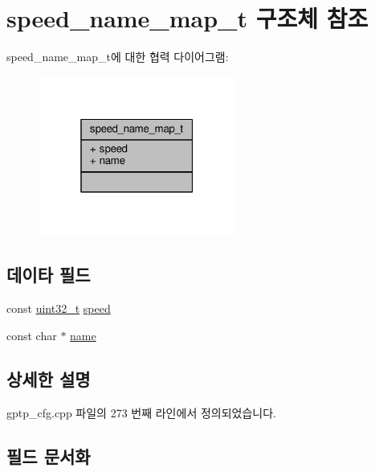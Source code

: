 \hypertarget{structspeed__name__map__t}{}\section{speed\+\_\+name\+\_\+map\+\_\+t 구조체 참조}
\label{structspeed__name__map__t}


speed\+\_\+name\+\_\+map\+\_\+t에 대한 협력 다이어그램\+:
\nopagebreak
\begin{figure}[H]
\begin{center}
\leavevmode
\includegraphics[width=184pt]{structspeed__name__map__t__coll__graph}
\end{center}
\end{figure}
\subsection*{데이타 필드}
\begin{DoxyCompactItemize}
\item 
const \hyperlink{parse_8c_a6eb1e68cc391dd753bc8ce896dbb8315}{uint32\+\_\+t} \hyperlink{structspeed__name__map__t_a4bec965cf156a882c43280397a9d3f19}{speed}
\item 
const char $\ast$ \hyperlink{structspeed__name__map__t_a8f8f80d37794cde9472343e4487ba3eb}{name}
\end{DoxyCompactItemize}


\subsection{상세한 설명}


gptp\+\_\+cfg.\+cpp 파일의 273 번째 라인에서 정의되었습니다.



\subsection{필드 문서화}
